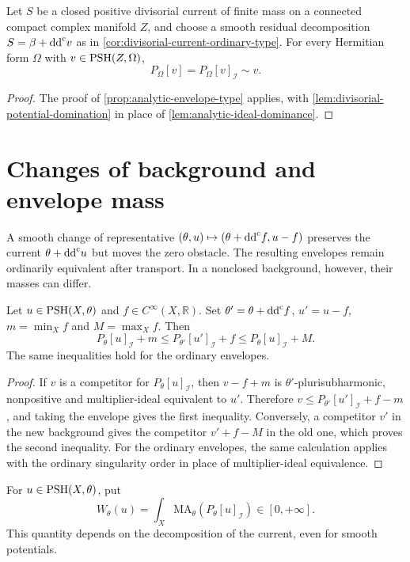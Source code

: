 \begin{corollary}\label{cor:divisorial-envelope-equality}
Let $S$ be a closed positive divisorial current of finite mass on a connected compact complex manifold $Z$, and choose a smooth residual decomposition $S=\beta+\mathrm{dd}^{\mathrm{c}} v$ as in \cref{cor:divisorial-current-ordinary-type}. For every Hermitian form $\Omega$ with $v\in\mathrm{PSH}(Z,\Omega)$,
\[
 P_\Omega[v]=P_\Omega[v]_{\mathcal I}\sim v.
\]
\end{corollary}
\begin{proof}
The proof of \cref{prop:analytic-envelope-type} applies, with \cref{lem:divisorial-potential-domination} in place of \cref{lem:analytic-ideal-dominance}.
\end{proof}

\section{Changes of background and envelope mass}

A smooth change of representative $(\theta,u)\mapsto(\theta+\mathrm{dd}^{\mathrm{c}} f,u-f)$ preserves the current $\theta+\mathrm{dd}^{\mathrm{c}} u$ but moves the zero obstacle. The resulting envelopes remain ordinarily equivalent after transport. In a nonclosed background, however, their masses can differ.

\begin{proposition}\label{prop:i-envelope-gauge}
Let $u\in\mathrm{PSH}(X,\theta)$ and $f\in C^\infty(X,\mathbb R)$. Set $\theta'=\theta+\mathrm{dd}^{\mathrm{c}} f$, $u'=u-f$, $m=\min_Xf$ and $M=\max_Xf$. Then
\[
 P_\theta[u]_{\mathcal I}+m
 \leq P_{\theta'}[u']_{\mathcal I}+f
 \leq P_\theta[u]_{\mathcal I}+M.
\]
The same inequalities hold for the ordinary envelopes.
\end{proposition}
\begin{proof}
If $v$ is a competitor for $P_\theta[u]_{\mathcal I}$, then $v-f+m$ is $\theta'$-plurisubharmonic, nonpositive and multiplier-ideal equivalent to $u'$. Therefore
$v\leq P_{\theta'}[u']_{\mathcal I}+f-m$,
and taking the envelope gives the first inequality. Conversely, a competitor $v'$ in the new background gives the competitor $v'+f-M$ in the old one, which proves the second inequality. For the ordinary envelopes, the same calculation applies with the ordinary singularity order in place of multiplier-ideal equivalence.
\end{proof}

For $u\in\mathrm{PSH}(X,\theta)$, put
\[
 W_\theta(u)=\int_X\mathrm{MA}_\theta(P_\theta[u]_{\mathcal I})\in[0,+\infty].
\]
This quantity depends on the decomposition of the current, even for smooth potentials.

